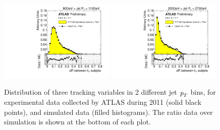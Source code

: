 \begin{figure}[tp]
\includegraphics[width=0.49\textwidth]{FIGS/dataMC/FullDataVarDRktaxisPT080.pdf}
\includegraphics[width=0.49\textwidth]{FIGS/dataMC/FullDataVarDRktaxisPT200.pdf}  
\caption{ Distribution of three tracking variables in 2 different jet ${\emph{p}_{T}}$ bins, for experimental data  collected by ATLAS during 2011 (solid black points), and simulated data (filled histograms). The ratio data over simulation is shown at the bottom of each plot.}
\label{fig:datamcinputvars}
\end{figure}






%
%
